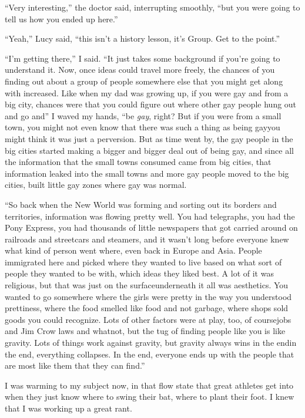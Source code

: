 “Very interesting,” the doctor said, interrupting smoothly, “but
you were going to tell us how you ended up here.”

“Yeah,” Lucy said, “this isn’t a history lesson, it’s Group. Get to
the point.”

“I’m getting there,” I said. “It just takes some background if
you’re going to understand it. Now, once ideas could travel more
freely, the chances of you finding out about a group of people
somewhere else that you might get along with increased. Like when
my dad was growing up, if you were gay and from a big city, chances
were that you could figure out where other gay people hung out and
go and{\dash}” I waved my hands, “be \emph{gay}, right? But if you were
from a small town, you might not even know that there was such a
thing as being gay{\dash}you might think it was just a perversion. But as
time went by, the gay people in the big cities started making a
bigger and bigger deal out of being gay, and since all the
information that the small towns consumed came from big cities,
that information leaked into the small towns and more gay people
moved to the big cities, built little gay zones where gay was
normal.

“So back when the New World was forming and sorting out its borders
and territories, information was flowing pretty well. You had
telegraphs, you had the Pony Express, you had thousands of little
newspapers that got carried around on railroads and streetcars and
steamers, and it wasn’t long before everyone knew what kind of
person went where, even back in Europe and Asia. People immigrated
here and picked where they wanted to live based on what sort of
people they wanted to be with, which ideas they liked best. A lot
of it was religious, but that was just on the surface{\dash}underneath it
all was aesthetics. You wanted to go somewhere where the girls were
pretty in the way you understood prettiness, where the food smelled
like food and not garbage, where shops sold goods you could
recognize. Lots of other factors were at play, too, of course{\dash}jobs
and Jim Crow laws and whatnot, but the tug of finding people like
you is like gravity. Lots of things work against gravity, but
gravity always wins in the end{\dash}in the end, everything collapses. In
the end, everyone ends up with the people that are most like them
that they can find.”

I was warming to my subject now, in that flow state that great
athletes get into when they just know where to swing their bat,
where to plant their foot. I knew that I was working up a great
rant.

